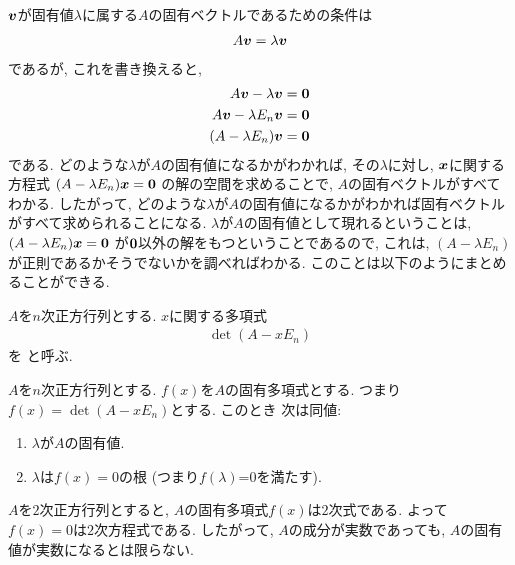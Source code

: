 $\boldsymbol{v}$が固有値$\lambda$に属する$A$の固有ベクトルであるための条件は
\begin{align*}
  A\boldsymbol{v}=\lambda\boldsymbol{v}
\end{align*}
であるが,
これを書き換えると,
\begin{align*}
  A\boldsymbol{v}-\lambda\boldsymbol{v}&=\boldsymbol{0}\\
  A\boldsymbol{v}-\lambda E_n \boldsymbol{v}&=\boldsymbol{0}\\
  (A-\lambda E_n) \boldsymbol{v}&=\boldsymbol{0}
\end{align*}
である.
どのような$\lambda$が$A$の固有値になるかがわかれば,
その$\lambda$に対し,
$\boldsymbol{x}$に関する方程式
$(A-\lambda E_n) \boldsymbol{x}=\boldsymbol{0}$
の解の空間を求めることで,
$A$の固有ベクトルがすべてわかる.
したがって,
どのような$\lambda$が$A$の固有値になるかがわかれば固有ベクトルがすべて求められることになる.
$\lambda$が$A$の固有値として現れるということは,
$(A-\lambda E_n) \boldsymbol{x}=\boldsymbol{0}$
が$\boldsymbol{0}$以外の解をもつということであるので,
これは, $(A-\lambda E_n)$が正則であるかそうでないかを調べればわかる.
このことは以下のようにまとめることができる.
\begin{definition}
  \label{def:charpoly}
  $A$を$n$次正方行列とする.
  $x$に関する多項式
  \begin{align*}
  \det(A-xE_n)
  \end{align*}
  を
  と呼ぶ.
\end{definition}
\begin{prop}
  $A$を$n$次正方行列とする.
  $f(x)$を$A$の固有多項式とする.
  つまり $f(x)=\det(A-xE_n)$とする.
  このとき 次は同値:
  \begin{enumerate}
  \item $\lambda$が$A$の固有値.
  \item $\lambda$は$f(x)=0$の根 (つまり$f(\lambda)$=0を満たす).
  \end{enumerate}
\end{prop}

\begin{remark}
  $A$を$2$次正方行列とすると, $A$の固有多項式$f(x)$は$2$次式である.
  よって$f(x)=0$は$2$次方程式である.
  したがって, $A$の成分が実数であっても,
  $A$の固有値が実数になるとは限らない.
\end{remark}

